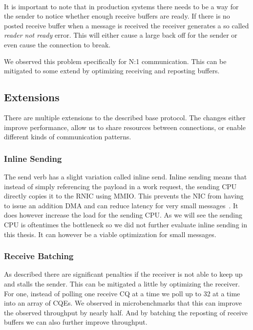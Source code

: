 \paragraph{} It is important to note that in production systems there needs to be a way for the sender to notice whether 
enough receive buffers are ready. If there is no posted receive buffer when a message is received the receiver  generates
a so called \emph{reader not ready} error. This will either cause a large back off for the sender or even cause the connection
to break.

We observed this problem specifically for N:1 communication. This can be mitigated to some extend by optimizing receiving and
reposting buffers.




\subsection{Extensions}

There are multiple extensions to the described base protocol. The changes either improve performance, allow us to
share resources between connections, or enable different kinds of communication patterns.

\subsubsection{Inline Sending}
The send verb has a slight variation called inline send. Inline sending means that instead of 
simply referencing the payload in a work request, the sending CPU directly copies it to the RNIC using MMIO. This prevents
the NIC from having to issue an addition DMA and can reduce latency for very small messages~\cite{anuj-guide}. It does however
increase the load for the sending CPU. As we will see the sending CPU is oftentimes the bottleneck so we did not further 
evaluate inline sending in this thesis. It can however be a viable optimization for small messages.


\subsubsection{Receive Batching} 
As described there are significant penalties if the receiver is not able to keep up and stalls the sender.
This can be mitigated a little by optimizing the receiver. For one, instead of polling one receive CQ at a time we poll up to 32
at a time into an array of CQEs. We observed in microbenchmarks that this can improve the observed throughput by nearly half.
And by batching the reposting of receive buffers we can also further improve throughput.

